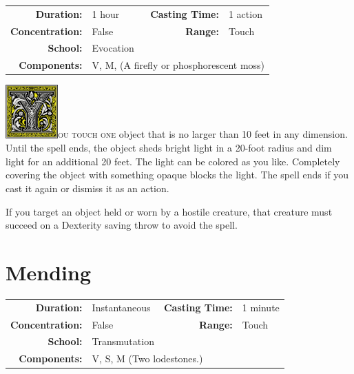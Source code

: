 \documentclass[12pt,showtrims]{memoir}
\begin{document}
{
\small\centering\vspace{-6pt}
\begin{tabular}{rlrl}
\toprule

\textbf{Duration:} & 1 hour&
\textbf{Casting Time:} & 1 action\\
\textbf{Concentration:} & False &
\textbf{Range:} & Touch \\
\textbf{School:} & Evocation \\
\textbf{Components:} & \multicolumn{3}{p{0.7\textwidth}}{V, M, (A firefly or phosphorescent moss)}\\

\bottomrule
\end{tabular}
}
\vspace{1\baselineskip}\noindent
\lettrine[lines=4]{\includegraphics[height=58pt]{initials/Y.png}}{ou touch one} object that is no larger than 10 feet in any dimension. Until the spell ends, the object sheds bright light in a 20-foot radius and dim light for an additional 20 feet. The light can be colored as you like. Completely covering the object with something opaque blocks the light. The spell ends if you cast it again or dismiss it as an action.

If you target an object held or worn by a hostile creature, that creature must succeed on a Dexterity saving throw to avoid the spell.
\newpage

\newpage
{}
\newpage

\section*{Mending}

{
\small\centering\vspace{-6pt}
\begin{tabular}{rlrl}
\toprule

\textbf{Duration:} & Instantaneous &
\textbf{Casting Time:} & 1 minute \\
\textbf{Concentration:} & False &
\textbf{Range:} & Touch \\
\textbf{School:} & Transmutation \\
\textbf{Components:} & \multicolumn{3}{p{0.7\textwidth}}{V, S, M (Two lodestones.)}\\

\bottomrule
\end{tabular}
}
\end{document}
